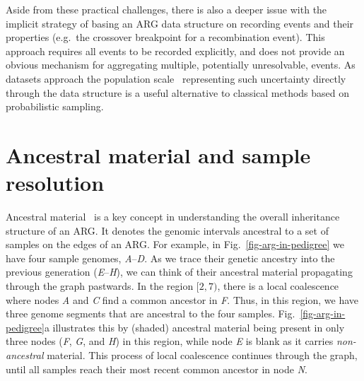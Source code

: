 \documentclass[9pt,twocolumn,twoside]{gsajnl}
\newcommand{\noderef}[1]{\textit{#1}}
\begin{document}
Aside from these practical challenges, there is also a deeper
issue with the implicit strategy of basing an ARG data structure on
recording events and their properties (e.g.\ the crossover breakpoint
for a recombination event). 
This approach 
requires all events to be recorded explicitly, and does not 
provide an obvious mechanism for aggregating multiple, potentially
unresolvable, events.
As datasets approach the population scale~\citep[e.g.][]{
turnbull2018hundred, bycroft2018genome,hayes20191000,
Ros-Freixedes2020,karczewski2020mutational,tanjo2021practical,
halldorsson2022sequences} representing such uncertainty 
directly through the data structure is a useful alternative to 
classical methods based on probabilistic sampling.


\section{Ancestral material and sample resolution}
\label{sec-ancestral-material}
Ancestral material~\citep{wiuf1999ancestry,wiuf1999recombination}
is a key concept in understanding the overall inheritance structure
of an ARG.
It denotes the genomic intervals ancestral to a set of samples
on the edges of an ARG.
For example, in Fig.~\ref{fig-arg-in-pedigree} we have
four sample genomes, \noderef{A}--\noderef{D}. As we
trace their genetic ancestry into the previous generation
(\noderef{E}--\noderef{H}), we can think of their ancestral
material propagating through the graph
pastwards. In the region $[2, 7)$, there is a
local coalescence where nodes \noderef{A} and \noderef{C}
find a common ancestor in \noderef{F}. Thus, in this region,
we have three genome segments that are ancestral to the
four samples. Fig.~\ref{fig-arg-in-pedigree}a
illustrates this by (shaded) ancestral material being present
in only three nodes (\noderef{F}, \noderef{G}, and \noderef{H}) in this region,
while node \noderef{E} is blank
as it carries \emph{non-ancestral} material.
This process of local coalescence continues through the
graph, until all samples reach their most recent common
ancestor in node \noderef{N}.
\end{document}
